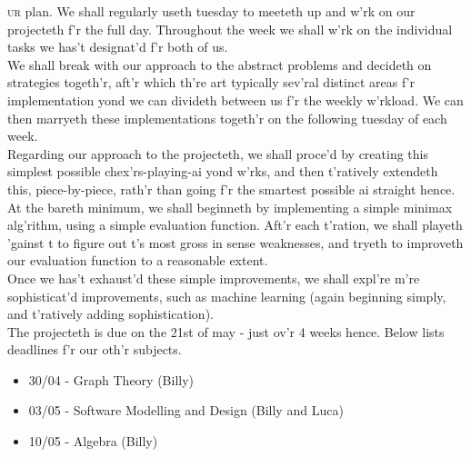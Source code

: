 \documentclass{article}[11pt]
\begin{document}
{\frakfamily\fraklines \lettrine[lines=2]{}{ur} plan.
We shall regularly useth tuesday to meeteth up and w'rk on our projecteth f'r the full day.  Throughout the week we shall w'rk on the individual tasks we has't designat'd f'r both of us. \\
 
We shall break with our approach to the abstract problems and decideth on strategies togeth'r, aft'r which th're art typically sev'ral distinct areas f'r implementation yond we can divideth between us f'r the weekly w'rkload.  We can then marryeth these implementations togeth'r on the following tuesday of each week. \\
 
Regarding our approach to the projecteth, we shall proce'd by creating this simplest possible chex'rs-playing-ai yond w'rks, and then t'ratively extendeth this, piece-by-piece, rath'r than going f'r the smartest possible ai straight hence. \\
 
At the bareth minimum, we shall beginneth by implementing a simple minimax alg'rithm, using a simple evaluation function.  Aft'r each t'ration, we shall playeth 'gainst t to figure out t's most gross in sense weaknesses, and tryeth to improveth our evaluation function to a reasonable extent. \\
 
Once we has't exhaust'd these simple improvements, we shall expl're m're sophisticat'd improvements, such as machine learning (again beginning simply, and t'ratively adding sophistication). \\
 
The projecteth is due on the 21st of may - just ov'r 4 weeks hence.  Below lists deadlines f'r our oth'r subjects.
\begin{itemize}
    \item 30/04 - Graph Theory (Billy)
    \item 03/05 - Software Modelling and Design (Billy and Luca)
    \item 10/05 - Algebra (Billy)
\end{itemize}



}
\end{document}
